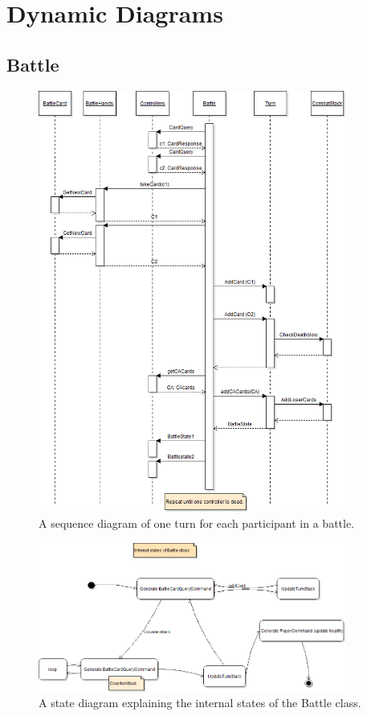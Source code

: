 \section{Dynamic Diagrams}
\subsection{Battle}
\label{sec:dynamics}
\begin{figure}[h]
\center
\includegraphics[width=0.9\textwidth]{diagrams/BattleSequenceDiagram.png}
\caption{A sequence diagram of one turn for each participant in a battle.}
\label{fig:battle_sequence_diagram}
\end{figure}

\begin{figure}[h]
\center
\includegraphics[width=0.9\textwidth]{diagrams/BattleStateDiagram.png}
\caption{A state diagram explaining the internal states of the Battle class.}
\label{fig:battle_state_diagram}
\end{figure}



